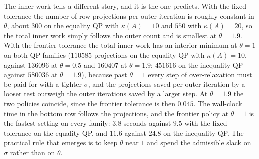 \documentclass[11pt]{article}
\begin{document}
The inner work tells a different story, and it is the one  predicts.
With the fixed tolerance the number of row projections per outer iteration is roughly constant in $\theta$, about $300$ on the equality QP with $\kappa(A) = 10$ and $550$ with $\kappa(A) = 20$, so the total inner work simply follows the outer count and is smallest at $\theta = 1.9$.
With the frontier tolerance the total inner work has an interior minimum at $\theta = 1$ on both QP families ($110585$ projections on the equality QP with $\kappa(A) = 10$, against $136096$ at $\theta = 0.5$ and $160407$ at $\theta = 1.9$; $451616$ on the inequality QP against $580036$ at $\theta = 1.9$), because past $\theta = 1$ every step of over-relaxation must be paid for with a tighter $\sigma$, and the projections saved per outer iteration by a looser test outweigh the outer iterations saved by a larger step.
At $\theta = 1.9$ the two policies coincide, since the frontier tolerance is then $0.045$.
The wall-clock time in the bottom row follows the projections, and the frontier policy at $\theta = 1$ is the fastest setting on every family: $3.8$ seconds against $9.5$ with the fixed tolerance on the equality QP, and $11.6$ against $24.8$ on the inequality QP.
The practical rule that emerges is to keep $\theta$ near $1$ and spend the admissible slack on $\sigma$ rather than on $\theta$.
\end{document}
